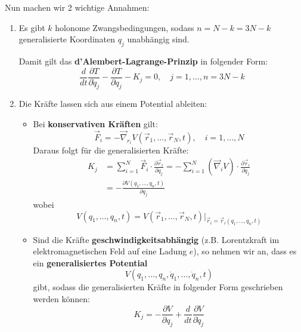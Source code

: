 \documentclass[10pt, letterpaper]{article}
\begin{document}
Nun machen wir 2 wichtige Annahmen:
\begin{enumerate}[label=\textbf{\arabic*)}, left=0pt, align=left, itemsep=1.2em]

  \item Es gibt \( k \) holonome Zwangsbedingungen, sodass $n = N - k = 3N - k$ generalisierte Koordinaten \( q_j \) unabhängig sind.

  Damit gilt das \textbf{d'Alembert-Lagrange-Prinzip} in folgender Form:
  \begin{equation*}
  \frac{d}{dt} \frac{\partial T}{\partial \dot{q}_j} - \frac{\partial T}{\partial q_j} - K_j = 0, 
  \quad j = 1, \dotsc, n = 3N - k \tag{1}
  \end{equation*}

  \item Die Kräfte lassen sich aus einem Potential ableiten:

  \begin{itemize}
    \item[(a)] Bei \textbf{konservativen Kräften} gilt:
    \[
    \vec{F}_i = - \vec{\nabla}_{r_i} V(\vec{r}_1, \dotsc, \vec{r}_N, t), 
    \quad i = 1, \dotsc, N
    \]
    Daraus folgt für die generalisierten Kräfte:
    \[
    \begin{aligned}
    K_j &= \sum_{i=1}^N \vec{F}_i \cdot \frac{\partial \vec{r}_i}{\partial q_j}
    = -\sum_{i=1}^N (\vec{\nabla}_i V) \cdot \frac{\partial \vec{r}_i}{\partial q_j} \\
    &= -\frac{\partial V(q_1, \dotsc, q_n, t)}{\partial q_j}
    \end{aligned}
    \]
    wobei
    \[
    V(q_1, \dotsc, q_n, t) 
    = V(\vec{r}_1, \dotsc, \vec{r}_N, t)\big|_{\vec{r}_i = \vec{r}_i(q_1, \dotsc, q_n, t)}
    \]

    \item[(b)] Sind die Kräfte \textbf{geschwindigkeitsabhängig} (z.B. Lorentzkraft im elektromagnetischen Feld auf eine Ladung \( e \)), so nehmen wir an, dass es ein \textbf{generalisiertes Potential}
    \[
    V(q_1, \dotsc, q_n, \dot{q}_1, \dotsc, \dot{q}_n, t)
    \]
    gibt, sodass die generalisierten Kräfte in folgender Form geschrieben werden können:
    \begin{equation*}
    K_j = -\frac{\partial V}{\partial q_j} + \frac{d}{dt} \frac{\partial V}{\partial \dot{q}_j} \tag{2}
    \end{equation*}
  \end{itemize}

\end{enumerate}
\end{document}
